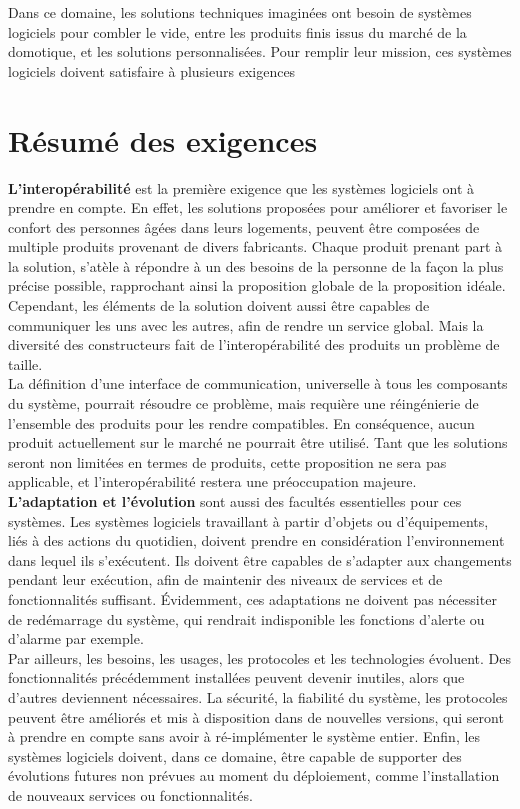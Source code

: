Dans ce domaine, les solutions techniques imaginées ont besoin de systèmes logiciels pour combler le vide, entre les produits finis issus du marché de la domotique, et les solutions personnalisées. Pour remplir leur mission, ces systèmes logiciels doivent satisfaire à plusieurs exigences

\section{Résumé des exigences}
\label{sec:concluRequirementsFr}

{\bf L'interopérabilité} est la première exigence que les systèmes logiciels ont à prendre en compte. En effet, les solutions proposées pour améliorer et favoriser le confort des personnes âgées dans leurs logements, peuvent être composées de multiple produits provenant de divers fabricants. Chaque produit prenant part à la solution, s'atèle à répondre à un des besoins de la personne de la façon la plus précise possible, rapprochant ainsi la proposition globale de la proposition idéale. Cependant, les éléments de la solution doivent aussi être capables de communiquer les uns avec les autres, afin de rendre un service global. Mais la diversité des constructeurs fait de l'interopérabilité des produits un problème de taille.\\
La définition d'une interface de communication, universelle à tous les composants du système, pourrait résoudre ce problème, mais requière une réingénierie de l'ensemble des produits pour les rendre compatibles. En conséquence, aucun produit actuellement sur le marché ne pourrait être utilisé. Tant que les solutions seront non limitées en termes de produits, cette proposition ne sera pas applicable, et l'interopérabilité restera une préoccupation majeure.\\

{\bf L'adaptation et l'évolution} sont aussi des facultés essentielles pour ces systèmes. Les systèmes logiciels travaillant à partir d'objets ou d'équipements, liés à des actions du quotidien, doivent prendre en considération l'environnement dans lequel ils s'exécutent. Ils doivent être capables de s'adapter aux changements pendant leur exécution, afin de maintenir des niveaux de services et de fonctionnalités suffisant. Évidemment, ces adaptations ne doivent pas nécessiter de redémarrage du système, qui rendrait indisponible les fonctions d'alerte ou d'alarme par exemple.\\
Par ailleurs, les besoins, les usages, les protocoles et les technologies évoluent. Des fonctionnalités précédemment installées peuvent devenir inutiles, alors que d'autres deviennent nécessaires. La sécurité, la fiabilité du système, les protocoles peuvent être améliorés et mis à disposition dans de nouvelles versions, qui seront à prendre en compte sans avoir à ré-implémenter le système entier. Enfin, les systèmes logiciels doivent, dans ce domaine, être capable de supporter des évolutions futures non prévues au moment du déploiement, comme l'installation de nouveaux services ou fonctionnalités.\\

